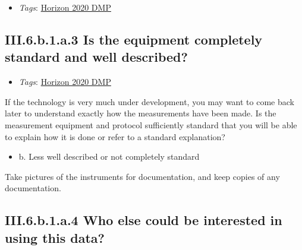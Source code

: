 \documentclass[a4paper,12pt]{report}
\begin{document}
\begin{itemize}
  \item \textit{Tags}: \ul{Horizon 2020 DMP}
  \end{itemize}





\subsection*{\protect\textcolor{colorSecId}{III.6.b.1.a.3} Is the equipment completely standard and well described?}

\label{b1df3c74-0b1f-4574-81c4-4cc2d780c1af.f87c331d-794a-42c8-a910-61a2a9110dab.e4ca2d31-137a-46d3-96cd-3e9e8c5e9a76.f5fef09d-ade5-4019-b089-f05bd89c34bc.0c3ac72c-1f6a-4c3c-b8d2-6bf287367436.bce52f7f-2256-4afc-9801-2e4da8111470}


\begin{itemize}
  \item \textit{Tags}: \ul{Horizon 2020 DMP}
  \end{itemize}


\noindent
\begin{markdown}
If the technology is very much under development, you may want to come back later to understand exactly how the measurements have been made. Is the measurement equipment and protocol sufficiently standard that you will be able to explain how it is done or refer to a standard explanation?
\end{markdown}



\begin{itemize}
  \item[\CheckmarkBold] b. Less well described or not completely standard
\end{itemize}

\noindent
\begin{markdown}
Take pictures of the instruments for documentation, and keep copies of any documentation.
\end{markdown}



\subsection*{\protect\textcolor{colorSecId}{III.6.b.1.a.4} Who else could be interested in using this data?}
\end{document}
